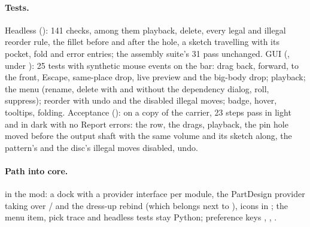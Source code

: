 \paragraph{Tests.} Headless (): 141 checks, among them playback, delete,
every legal and illegal reorder rule, the fillet before and after the hole, a sketch travelling with its pocket,
fold and error entries; the assembly suite's 31 pass unchanged. GUI (,
under ): 25 tests with synthetic mouse events on the bar: drag back, forward, to the front,
Escape, same-place drop, live preview and the big-body drop; playback; the menu (rename, delete with and without
the dependency dialog, roll, suppress); reorder with undo and the disabled illegal moves; badge, hover, tooltips,
folding. Acceptance (): on a copy of the carrier, 23 steps pass in light and in
dark with no Report errors: the row, the drags, playback, the pin hole moved before the output shaft with the same
volume and its sketch along, the pattern's and the disc's illegal moves disabled, undo.

\paragraph{Path into core.}  in the mod: a  dock with a provider
interface per module, the PartDesign provider taking over  /  and
the dress-up rebind (which belongs next to ), icons in ; the menu item,
pick trace and headless tests stay Python; preference keys ,
, .


